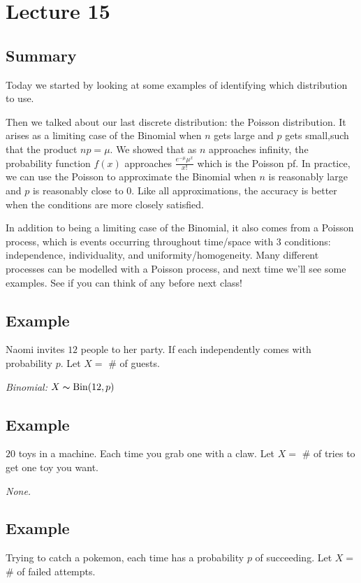 \section{Lecture 15}
\subsection{Summary}

Today we started by looking at some examples of identifying which distribution to use. 

Then we talked about our last discrete distribution: the Poisson distribution. It arises as a limiting case of the Binomial when $n$ gets large and $p$ gets small,such that the product $np = \mu$. We showed that as $n$ approaches infinity, the probability function $f(x)$ approaches $ \frac{e^{-\mu}\mu^x}{x!} $ which is the Poisson pf. In practice, we can use the Poisson to approximate the Binomial when $n$ is reasonably large and $p$ is reasonably close to $0$. Like all approximations, the accuracy is better when the conditions are more closely satisfied.

In addition to being a limiting case of the Binomial, it also comes from a Poisson process, which is events occurring throughout time/space with 3 conditions: independence, individuality, and uniformity/homogeneity. Many different processes can be modelled with a Poisson process, and next time we'll see some examples. See if you can think of any before next class!

\subsection{Example}
Naomi invites $ 12 $ people to her party. If each independently comes with
probability $ p $.
Let $ X= $ \# of guests.

\emph{Binomial:} $ X \thicksim \operatorname{Bin}(12,p) $

\subsection{Example}
$ 20 $ toys in a machine. Each time you grab one with a claw. 
Let $ X= $ \# of tries to get one toy you want.

\emph{None.}

\subsection{Example}
Trying to catch a pokemon, each time has a probability $ p $ of succeeding.
Let $ X= $ \# of failed attempts.

